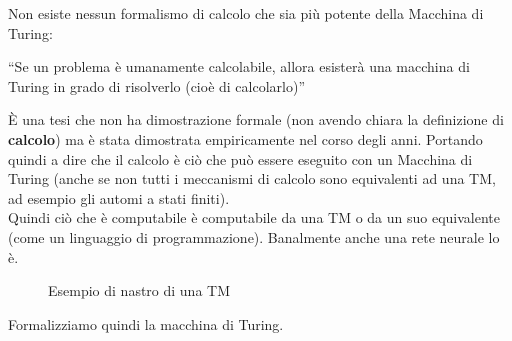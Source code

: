 \documentclass[a4paper,12pt, oneside]{book}
\begin{document}
\begin{teorema}
  Non esiste nessun formalismo di calcolo che sia più
  potente della Macchina di Turing:
  \begin{center}
   ``Se un problema è umanamente calcolabile, allora esisterà una macchina di
    Turing in grado di risolverlo (cioè di calcolarlo)''
  \end{center}
  È una tesi che non ha dimostrazione formale (non avendo chiara la definizione
  di \textbf{calcolo}) ma è stata dimostrata
  empiricamente nel corso degli anni. Portando quindi a dire che il calcolo è
  ciò che può essere eseguito con un Macchina di Turing (anche se non tutti i
  meccanismi di calcolo sono equivalenti ad una TM, ad esempio gli automi a
  stati finiti).\\
  Quindi ciò che è computabile è computabile da una TM o da un suo equivalente
  (come un linguaggio di programmazione). Banalmente anche una rete neurale lo
  è. 
\end{teorema}
\begin{figure}
  \centering
  \caption{Esempio di nastro di una TM}
  \label{fig:tur}
\end{figure}
Formalizziamo quindi la macchina di Turing.
\end{document}
